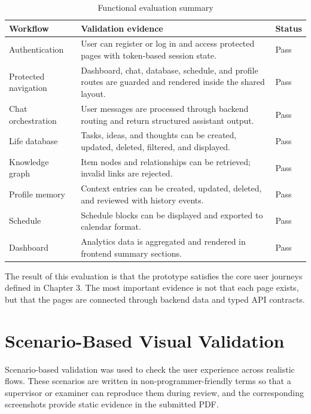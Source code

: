 \begin{longtable}{|p{}|p{}|p{}|}
\caption{Functional evaluation summary}
\label{tab:functional-eval}\\
\hline
\textbf{Workflow} & \textbf{Validation evidence} & \textbf{Status}\\
\hline
Authentication & User can register or log in and access protected pages with token-based session state. & Pass\\
\hline
Protected navigation & Dashboard, chat, database, schedule, and profile routes are guarded and rendered inside the shared layout. & Pass\\
\hline
Chat orchestration & User messages are processed through backend routing and return structured assistant output. & Pass\\
\hline
Life database & Tasks, ideas, and thoughts can be created, updated, deleted, filtered, and displayed. & Pass\\
\hline
Knowledge graph & Item nodes and relationships can be retrieved; invalid links are rejected. & Pass\\
\hline
Profile memory & Context entries can be created, updated, deleted, and reviewed with history events. & Pass\\
\hline
Schedule & Schedule blocks can be displayed and exported to calendar format. & Pass\\
\hline
Dashboard & Analytics data is aggregated and rendered in frontend summary sections. & Pass\\
\hline
\end{longtable}

The result of this evaluation is that the prototype satisfies the core user journeys defined in Chapter 3. The most important evidence is not that each page exists, but that the pages are connected through backend data and typed API contracts.

\section{Scenario-Based Visual Validation}

Scenario-based validation was used to check the user experience across realistic flows. These scenarios are written in non-programmer-friendly terms so that a supervisor or examiner can reproduce them during review, and the corresponding screenshots provide static evidence in the submitted PDF.


